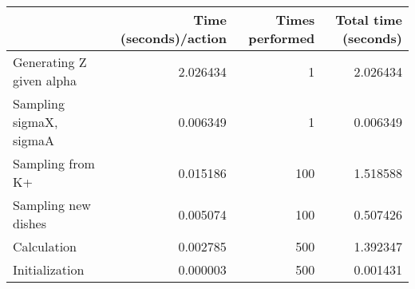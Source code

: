 \begin{tabular}{lrrr}
\toprule
{} &  Time (seconds)/action &  Times performed &  Total time (seconds) \\
\midrule
Generating Z given alpha &               2.026434 &                1 &              2.026434 \\
Sampling sigmaX, sigmaA  &               0.006349 &                1 &              0.006349 \\
Sampling from K+         &               0.015186 &              100 &              1.518588 \\
Sampling new dishes      &               0.005074 &              100 &              0.507426 \\
Calculation              &               0.002785 &              500 &              1.392347 \\
Initialization           &               0.000003 &              500 &              0.001431 \\
\bottomrule
\end{tabular}
